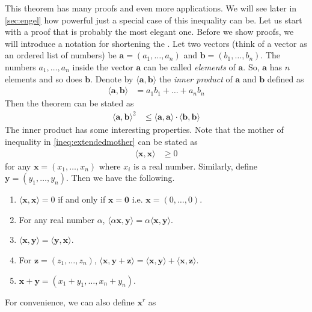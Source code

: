 \documentclass{subfile}
\begin{document}
	This theorem has many proofs and even more applications. We will see later in \autoref{sec:engel} how powerful just a special case of this inequality can be. Let us start with a proof that is probably the most elegant one. Before we show proofs, we will introduce a notation for shortening the . Let two vectors (think of a vector as an ordered list of numbers) be $\mathbf{a}=(a_1,\ldots,a_n)$ and $\mathbf{b}=(b_1,\ldots,b_n)$. The numbers $a_{1},\ldots,a_{n}$ inside the vector $\mathbf{a}$ can be called \textit{elements} of $\mathbf{a}$. So, $\mathbf{a}$ has $n$ elements and so does $\mathbf{b}$. Denote by $\langle \mathbf{a},\mathbf{b}\rangle$ the \textit{inner product} of $\mathbf{a}$ and $\mathbf{b}$ defined as
		\begin{align*}
			\langle \mathbf{a},\mathbf{b}\rangle
				& = a_1b_1+\ldots+a_nb_n
		\end{align*}
	Then the theorem can be stated as
		\begin{align*}
			\langle \mathbf{a},\mathbf{b}\rangle^2
				& \leq\langle\mathbf{a},\mathbf{a}\rangle\cdot\langle\mathbf{b},\mathbf{b}\rangle
		\end{align*}
	The inner product has some interesting properties. Note that the mother of inequality in \autoref{ineq:extendedmother} can be  stated as
		\begin{align*}
			\langle\mathbf{x},\mathbf{x}\rangle
				& \geq0
		\end{align*}
	for any $\mathbf{x}=(x_1,\ldots,x_n)$ where $x_i$ is a real number. Similarly, define $\mathbf{y}=(y_1,\ldots,y_n)$. Then we have the following.
		\begin{enumerate}[\itshape (i)]\label{list:innerprops}
			\item $\langle\mathbf{x},\mathbf{x}\rangle=0$ if and only if $\mathbf{x}=\mathbf{0}$ i.e. $\mathbf{x}=(0,\ldots,0)$.
			\item For any real number $\alpha$, $\langle\alpha\mathbf{x},\mathbf{y}\rangle=\alpha\langle\mathbf{x},\mathbf{y}\rangle$.
			\item $\langle\mathbf{x},\mathbf{y}\rangle=\langle\mathbf{y},\mathbf{x}\rangle$.
			\item For $\mathbf{z}=(z_1,\ldots,z_n)$, $\langle\mathbf{x},\mathbf{y}+\mathbf{z}\rangle=\langle\mathbf{x},\mathbf{y}\rangle+\langle\mathbf{x},\mathbf{z}\rangle$.
			\item $\mathbf{x}+\mathbf{y}=(x_{1}+y_{1},\ldots,x_{n}+y_{n})$.
		\end{enumerate}
	For convenience, we can also define $\mathbf{x}^{r}$ as
\end{document}
